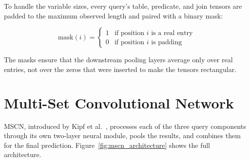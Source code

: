 To handle the variable sizes, every query's table, predicate, and join tensors are padded to the maximum observed length and paired with a binary mask:

\begin{equation}
\text{mask}(i) = \begin{cases} 1 & \text{if position } i \text{ is a real entry} \\ 0 & \text{if position } i \text{ is padding} \end{cases}
\end{equation}

The masks ensure that the downstream pooling layers average only over real entries, not over the zeros that were inserted to make the tensors rectangular.


\section{Multi-Set Convolutional Network}

MSCN, introduced by Kipf et al.~\cite{DBLP:conf/cidr/KipfKRLBK19}, processes each of the three query components through its own two-layer neural module, pools the results, and combines them for the final prediction. Figure~\ref{fig:mscn_architecture} shows the full architecture.

